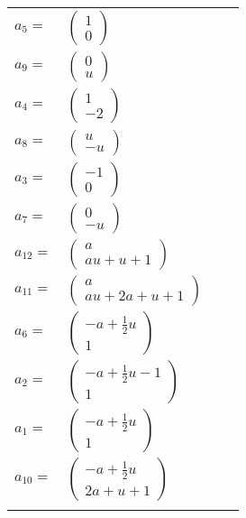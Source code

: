 \documentclass[1p]{elsarticle_modified}
\theoremstyle{definition}
\begin{document}
\begin{tabular}{m{7pt} m{180pt} m{7pt} m{180pt} }
\flushright $a_{5}=$&$\begin{pmatrix}1\\0\end{pmatrix}$ \\
\flushright $a_{9}=$&$\begin{pmatrix}0\\u\end{pmatrix}$ \\
\flushright $a_{4}=$&$\begin{pmatrix}1\\-2\end{pmatrix}$ \\
\flushright $a_{8}=$&$\begin{pmatrix}u\\- u\end{pmatrix}$ \\
\flushright $a_{3}=$&$\begin{pmatrix}-1\\0\end{pmatrix}$ \\
\flushright $a_{7}=$&$\begin{pmatrix}0\\- u\end{pmatrix}$ \\
\flushright $a_{12}=$&$\begin{pmatrix}a\\a u+u+1\end{pmatrix}$ \\
\flushright $a_{11}=$&$\begin{pmatrix}a\\a u+2 a+u+1\end{pmatrix}$ \\
\flushright $a_{6}=$&$\begin{pmatrix}- a+\frac{1}{2} u\\1\end{pmatrix}$ \\
\flushright $a_{2}=$&$\begin{pmatrix}- a+\frac{1}{2} u-1\\1\end{pmatrix}$ \\
\flushright $a_{1}=$&$\begin{pmatrix}- a+\frac{1}{2} u\\1\end{pmatrix}$ \\
\flushright $a_{10}=$&$\begin{pmatrix}- a+\frac{1}{2} u\\2 a+u+1\end{pmatrix}$\\&\end{tabular}
\end{document}
